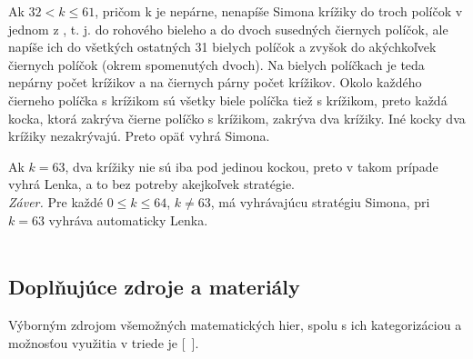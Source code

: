 Ak $32 < k \leq 61$, pričom k je nepárne, nenapíše Simona krížiky do troch políčok v jednom z , t. j. do rohového bieleho a do dvoch susedných čiernych políčok, ale napíše ich do všetkých ostatných 31 bielych políčok a zvyšok do akýchkoľvek čiernych políčok (okrem spomenutých dvoch). Na bielych políčkach je teda nepárny počet krížikov a na čiernych párny počet krížikov. Okolo každého čierneho políčka s krížikom sú všetky biele políčka tiež s krížikom, preto každá kocka, ktorá zakrýva čierne políčko s krížikom, zakrýva dva krížiky. Iné kocky dva krížiky nezakrývajú. Preto opäť vyhrá Simona.

Ak $k = 63$, dva krížiky nie sú iba pod jedinou kockou, preto v takom prípade vyhrá Lenka, a to bez potreby akejkoľvek stratégie.\\
\textit{Záver.} Pre každé $0 \leq k \leq 64$, $k \neq 63$, má vyhrávajúcu stratégiu Simona, pri $k = 63$ vyhráva automaticky Lenka.\\
\\

\subsection*{Doplňujúce zdroje a materiály}
Výborným zdrojom všemožných matematických hier, spolu s ich kategorizáciou a možnosťou využitia v triede je  [~\cite{burjan1999}].

